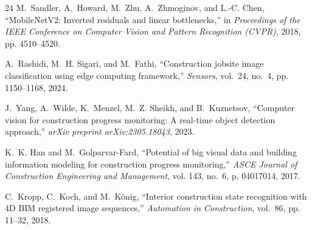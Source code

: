 \documentclass[conference]{IEEEtran}
\begin{document}
\begin{thebibliography}{24}
M.~Sandler, A.~Howard, M.~Zhu, A.~Zhmoginov, and L.-C. Chen, ``{MobileNetV2}: Inverted residuals and linear bottlenecks,'' in \emph{Proceedings of the IEEE Conference on Computer Vision and Pattern Recognition (CVPR)}, 2018, pp. 4510--4520.

A.~Rashidi, M.~H. Sigari, and M.~Fathi, ``Construction jobsite image classification using edge computing framework,'' \emph{Sensors}, vol.~24, no.~4, pp. 1150--1168, 2024.

J.~Yang, A.~Wilde, K.~Menzel, M.~Z. Sheikh, and B.~Kuznetsov, ``Computer vision for construction progress monitoring: A real-time object detection approach,'' \emph{arXiv preprint arXiv:2305.18043}, 2023.

K.~K. Han and M.~Golparvar-Fard, ``Potential of big visual data and building information modeling for construction progress monitoring,'' \emph{ASCE Journal of Construction Engineering and Management}, vol. 143, no.~6, p. 04017014, 2017.

C.~Kropp, C.~Koch, and M.~K{\"o}nig, ``Interior construction state recognition with 4{D} {BIM} registered image sequences,'' \emph{Automation in Construction}, vol.~86, pp. 11--32, 2018.

\end{thebibliography}
\end{document}
